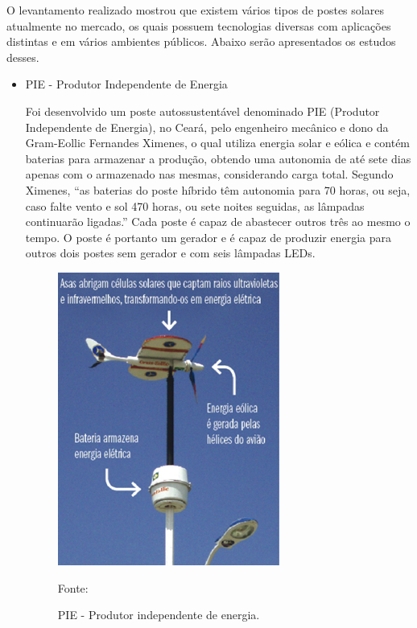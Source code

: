 	O levantamento realizado mostrou que existem vários tipos de postes solares atualmente no mercado, os quais possuem  tecnologias diversas com aplicações distintas e em vários ambientes públicos.  Abaixo serão apresentados os estudos desses.

\begin{itemize}
	\item PIE - Produtor Independente de Energia
	
	Foi desenvolvido um poste autossustentável denominado PIE (Produtor Independente de Energia), no Ceará, pelo engenheiro mecânico e dono da Gram-Eollic Fernandes Ximenes, o qual utiliza energia solar e eólica e contém baterias para armazenar a produção, obtendo uma autonomia de até sete dias apenas com o armazenado nas mesmas, considerando carga total. Segundo Ximenes, “as baterias do poste híbrido têm autonomia para 70 horas, ou seja, caso falte vento e sol 470 horas, ou sete noites seguidas, as lâmpadas continuarão ligadas.” Cada poste é capaz de abastecer outros três ao mesmo o tempo. O poste é portanto um gerador e é capaz de produzir energia para outros dois postes sem gerador e com seis lâmpadas LEDs. 
	
	\begin{figure}[H]
	 \centering
	\label{Produtor independente de energia}
	 \includegraphics[keepaspectratio=true,scale=0.8]{postes/1.png}
	 \caption{PIE - Produtor independente de energia.}
	 \small{Fonte: }
	\end{figure}

\end{itemize}

